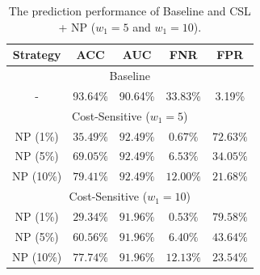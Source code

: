\documentclass[UTF8,12pt]{article}
\begin{document}
\newpage
\begin{table}[htbp]
    \centering
    \caption{The prediction performance of Baseline and CSL + NP ($w_1=5$ and $w_1=10$).}
    \label{tab:baseline_cost_results}
    \renewcommand\arraystretch{1.2} 
    \small
    \begin{tabular}{ccccc}
        \toprule
        Strategy & ACC & AUC & FNR & FPR \\
        \midrule
        \multicolumn{5}{c}{Baseline} \\
        \midrule
        - & 93.64\% & 90.64\% & 33.83\% & 3.19\% \\
        \midrule
        \multicolumn{5}{c}{Cost-Sensitive ($w_{1}=5$)} \\
        \midrule
        NP (1\%) & $35.49\%$ & $92.49\%$ & $0.67\%$ & $72.63\%$ \\
        NP (5\%) & $69.05\%$ & $92.49\%$ & $6.53\%$ & $34.05\%$ \\
        NP (10\%) & $79.41\%$ & $92.49\%$ & $12.00\%$ & $21.68\%$ \\
        \midrule
        \multicolumn{5}{c}{Cost-Sensitive ($w_{1}=10$)} \\
        \midrule
        NP (1\%) & $29.34\%$ & $91.96\%$ & $0.53\%$ & $79.58\%$ \\
        NP (5\%) & $60.56\%$ & $91.96\%$ & $6.40\%$ & $43.64\%$ \\
        NP (10\%) & $77.74\%$ & $91.96\%$ & $12.13\%$ & $23.54\%$ \\
        \bottomrule
    \end{tabular} 
\end{table}
\end{document}
